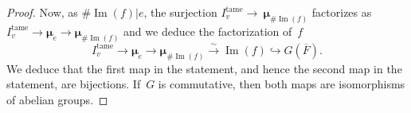 \documentclass[a4paper,english,12pt]{amsart}
\newcommand{\QQ}{\mathbb{Q}}
\newcommand{\oF}{\overline F}
\newcommand{\ZZ}{\mathbb{Z}}
\newcommand{\doots}{,\dots ,}
\newcommand{\muup}{\widehat{\muu}_v ^{(p)}}
\newcommand{\muu}{\boldsymbol{\mu}}
\DeclareMathOperator{\Hom}{Hom}
\DeclareMathOperator{\Imm}{Im}
\DeclareMathOperator{\un}{un}
\DeclareMathOperator{\tame}{{tame}}
\def\no{n\textsuperscript{0}\,}
\numberwithin{equation}{subsection}
\begin{document}
\begin{proof}
Now, as $\#\Imm(f)|e$, the surjection $I_v^{\tame}\to~\muu_{\#\Imm(f)}$ factorizes as $I_v^{\tame}\to\muu_e\to\muu_{\#\Imm(f)}$ and we deduce the factorization of~$f$ $$I_v^{\tame}\to\muu_{e}\to\muu_{\#\Imm(f)}\xrightarrow{\sim}\Imm(f)\hookrightarrow G(\overline F).$$
We deduce that the first map in the statement, and hence the second map in the statement, are bijections. If~$G$ is commutative, then both maps are isomorphisms of abelian groups. 
%
\end{proof}
\end{document}
